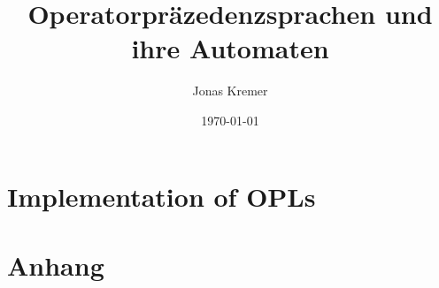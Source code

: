 \documentclass[12pt]{article}
\author{Jonas Kremer}
\title{Operatorpräzedenzsprachen und ihre Automaten}
\date{\today{}}
\theoremstyle{remark}
\begin{document}
\maketitle
\newpage
\tableofcontents
\newpage








\section{Implementation of OPLs}



\appendix

\section*{Anhang}


\end{document}

